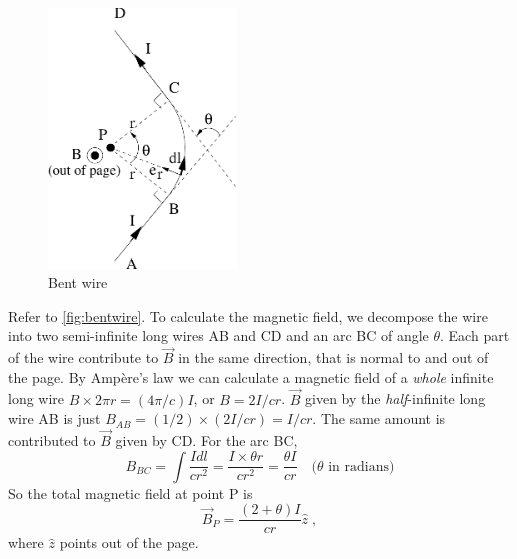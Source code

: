 \documentclass[makesolutionspdf]{esg8022pset}
\begin{document}
\begin{solution}
  \begin{figure}[H]
    \centering
    \includegraphics[width = 5cm]{BS1v05}
    \caption{Bent wire}
    \label{fig:bentwire}
  \end{figure}

  Refer to \autoref{fig:bentwire}.  To calculate the magnetic field, we
  decompose the wire into two semi-infinite long wires AB and CD and an arc BC
  of angle $\theta$.  Each part of the wire contribute to $\vec{B}$ in the same
  direction, that is normal to and out of the page.  By Amp\`{e}re's law we can
  calculate a magnetic field of a \emph{whole} infinite long wire $B\times 2\pi
  r=(4\pi/c)I$, or $B=2I/cr$.   $\vec{B}$ given by the \emph{half}-infinite
  long wire AB is just $B_{AB}=(1/2)\times (2I/cr)=I/cr$.  The same amount is
  contributed to $\vec{B}$ given by CD.  For the arc BC,
  \begin{equation}
    B_{BC}=\int\frac{Idl}{cr^2}=\frac{I\times \theta r}{cr^2}=\frac{\theta I}{cr}\quad\text{($\theta$ in radians)}
  \end{equation}
  So the total magnetic field at point P is 
  \begin{equation}
    \vec B_P=\frac{(2+\theta)I}{cr}\hat z\;,
  \end{equation}
  where $\hat z$ points out of the page.
\end{solution}
\end{document}
